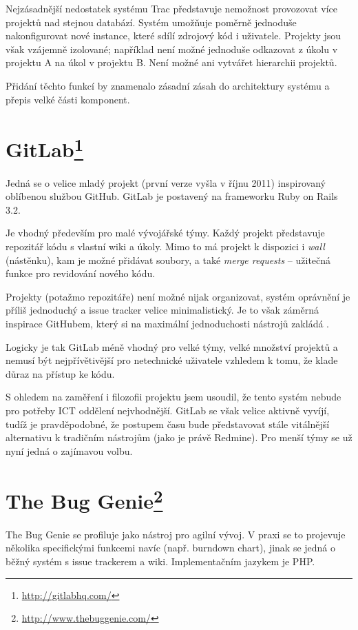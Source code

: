\documentclass[thesis=B,czech]{FITthesis}[2012/05/02]
\begin{document}
Nejzásadnější nedostatek systému Trac představuje nemožnost provozovat více
projektů nad stejnou databází. Systém umožňuje poměrně jednoduše
nakonfigurovat nové instance, které sdílí zdrojový kód i uživatele.
Projekty jsou však vzájemně izolované; například není možné jednoduše
odkazovat z úkolu v projektu A na úkol v projektu B. Není
možné ani vytvářet hierarchii projektů.

Přidání těchto funkcí by znamenalo zásadní zásah do architektury systému
a přepis velké části komponent.

\section[GitLab]{GitLab\footnote{\url{http://gitlabhq.com/}}}

Jedná se o velice mladý projekt (první verze vyšla v říjnu 2011)
inspirovaný oblíbenou službou GitHub. GitLab je postavený na frameworku
Ruby on Rails 3.2.

Je vhodný především pro malé vývojářské týmy. Každý projekt
představuje repozitář kódu s vlastní wiki a úkoly. Mimo to má projekt
k dispozici i \emph{wall} (nástěnku), kam je možné přidávat soubory, a také
\emph{merge requests} -- užitečná funkce pro revidování nového kódu.

Projekty (potažmo repozitáře) není možné nijak organizovat,
systém oprávnění je příliš jednoduchý a issue tracker velice
minimalistický. Je to však záměrná inspirace GitHubem, který si na
maximální jednoduchosti nástrojů zakládá \citep[snímky
55-71]{Holman2011}.

Logicky je tak GitLab méně vhodný pro velké týmy, velké množství
projektů a nemusí být nejpřívětivější pro netechnické uživatele vzhledem
k tomu, že klade důraz na přístup ke kódu.

S ohledem na zaměření i filozofii projektu jsem usoudil, že tento systém
nebude pro potřeby ICT oddělení nejvhodnější. GitLab se však velice
aktivně vyvíjí, tudíž je pravděpodobné, že postupem času bude
představovat stále vitálnější alternativu k tradičním nástrojům (jako je
právě Redmine). Pro menší týmy se už nyní jedná o zajímavou volbu.

\section[The Bug Genie]{The Bug Genie\footnote{\url{http://www.thebuggenie.com/}}}

The Bug Genie se profiluje jako nástroj pro agilní vývoj. V praxi se to
projevuje několika specifickými funkcemi navíc (např. burndown chart),
jinak se jedná o běžný systém s issue trackerem a wiki. Implementačním
jazykem je PHP.
\end{document}
